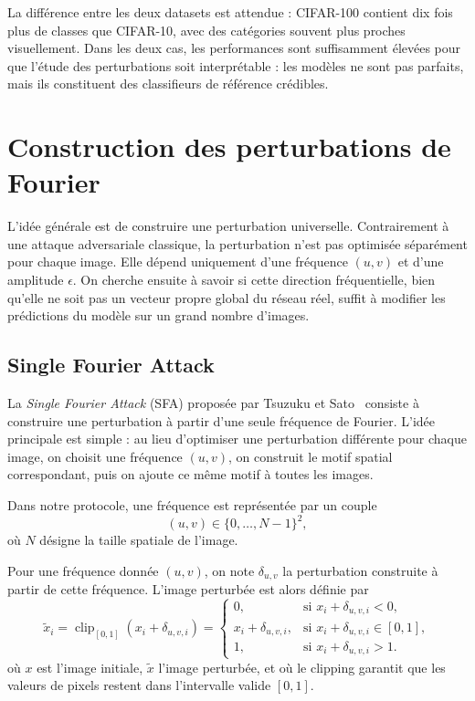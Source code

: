 La différence entre les deux datasets est attendue : CIFAR-100 contient dix fois plus de classes que
CIFAR-10, avec des catégories souvent plus proches visuellement. Dans les deux cas, les performances
sont suffisamment élevées pour que l'étude des perturbations soit interprétable : les modèles ne sont
pas parfaits, mais ils constituent des classifieurs de référence crédibles.

\section{Construction des perturbations de Fourier}
\label{sec:construction_perturbations_fourier}

L'idée générale est de construire une perturbation universelle. Contrairement à une attaque adversariale classique, 
la perturbation n'est pas optimisée séparément pour chaque image. 
Elle dépend uniquement d'une fréquence $(u,v)$ et d'une amplitude $\epsilon$. 
On cherche ensuite à savoir si cette direction fréquentielle, bien qu'elle ne soit pas un vecteur propre
global du réseau réel, suffit à modifier les prédictions du modèle sur un grand nombre d'images.

\subsection{Single Fourier Attack}
\label{subsec:single_fourier_attack}

La \textit{Single Fourier Attack} (SFA) proposée par Tsuzuku et Sato~\cite{tsuzuku2019structural}
consiste à construire une perturbation à partir d'une seule fréquence de Fourier. L'idée principale
est simple : au lieu d'optimiser une perturbation différente pour chaque image, on choisit une
fréquence $(u,v)$, on construit le motif spatial correspondant, puis on ajoute ce même motif à toutes
les images.

Dans notre protocole, une fréquence est représentée par un couple
\[
    (u,v) \in \{0,\dots,N-1\}^2,
\]
où $N$ désigne la taille spatiale de l'image. 

Pour une fréquence donnée $(u,v)$, on note $\delta_{u,v}$ la perturbation construite à partir de cette
fréquence. L'image perturbée est alors définie par
\begin{equation}
    \tilde{x}_{i}
    =
    \operatorname{clip}_{[0,1]}\left(x_i + \delta_{u,v,i}\right)
    =
    \begin{cases}
        0, & \text{si } x_i + \delta_{u,v,i} < 0, \\
        x_i + \delta_{u,v,i}, & \text{si } x_i + \delta_{u,v,i} \in [0,1], \\
        1, & \text{si } x_i + \delta_{u,v,i} > 1.
    \end{cases}
    \label{eq:single_fourier_attack}
\end{equation}
où $x$ est l'image initiale, $\tilde{x}$ l'image perturbée, et où le clipping garantit que les valeurs de
pixels restent dans l'intervalle valide $[0,1]$.

